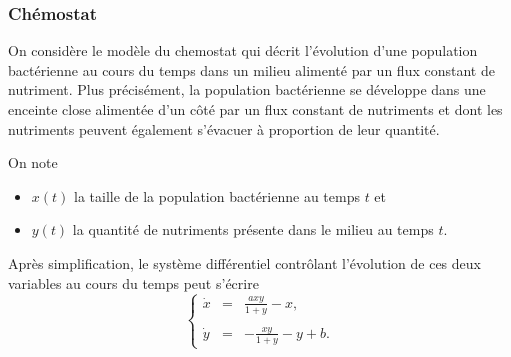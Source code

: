 \subsubsection{Chémostat}


On considère le modèle du chemostat qui décrit l'évolution d'une population bactérienne au cours du temps dans un milieu alimenté par un flux constant de nutriment. 
Plus précisément, la population bactérienne se développe dans une enceinte close alimentée d'un côté par un flux constant de nutriments et dont les nutriments peuvent également s'évacuer à proportion de leur quantité.

On note
\begin{itemize}
  \item $x(t)$ la taille de la population bactérienne au temps $t$ et
  \item $y(t)$ la quantité de nutriments présente dans le milieu au temps $t$.
\end{itemize}
Après simplification, le système différentiel contrôlant l'évolution de ces deux variables au cours du temps peut s'écrire
$$
\left\{\begin{array}{rcl} 
        \dot x & = & \displaystyle{\frac{a x y}{1 + y} - x}, \\
        \\
        \dot y & = & \displaystyle{- \frac{x y}{1 + y} - y + b}. 
       \end{array}
\right.
$$

